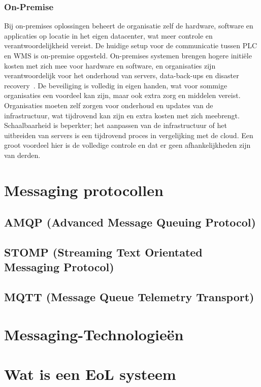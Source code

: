 \subsubsection{On-Premise}
Bij on-premises oplossingen beheert de organisatie zelf de hardware, software en applicaties op locatie in het eigen datacenter, wat meer controle en verantwoordelijkheid vereist.
De huidige setup voor de communicatie tussen PLC en WMS is on-premise opgesteld.
On-premises systemen brengen hogere initiële kosten met zich mee voor hardware en software, 
en organisaties zijn verantwoordelijk voor het onderhoud van servers, data-back-ups en disaster recovery~\autocite{Golec2021}.
De beveiliging is volledig in eigen handen, wat voor sommige organisaties een voordeel kan zijn, maar ook extra zorg en middelen vereist.
Organisaties moeten zelf zorgen voor onderhoud en updates van de infrastructuur, wat tijdrovend kan zijn en extra kosten met zich meebrengt.
Schaalbaarheid is beperkter; het aanpassen van de infrastructuur of het uitbreiden van servers is een tijdrovend proces in vergelijking met de cloud.
Een groot voordeel hier is de volledige controle en dat er geen afhankelijkheden zijn van derden.

\section{Messaging protocollen}

\subsection{AMQP (Advanced Message Queuing Protocol)} 

\subsection{STOMP (Streaming Text Orientated Messaging Protocol)}

\subsection{MQTT (Message Queue Telemetry Transport)}

\section{Messaging-Technologieën}


\section{Wat is een EoL systeem}

